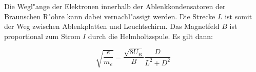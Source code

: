 		Die Wegl"ange der Elektronen innerhalb der Ablenkkondensatoren der Braunschen R"ohre kann dabei vernachl"assigt werden.
		Die Strecke $L$ ist somit der Weg zwischen Ab\-lenk\-plat\-ten und Leuchtschirm.
		Das Magnetfeld $B$ ist proportional zum Strom $I$ durch die Helm\-holtz\-spu\-le.
		Es gilt dann:

		\begin{equation}
			\sqrt{\frac{e}{m_e}} = \frac{\sqrt{8 U_\mathrm{B}}}{B} \frac{D}{L^2 + D^2}
		\end{equation}
